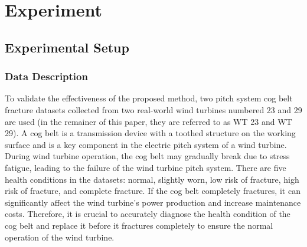 \documentclass[lettersize,journal]{IEEEtran}
\begin{document}
\section{Experiment}
\subsection{Experimental Setup}
\subsubsection{Data Description}
\label{secdatadesc}
To validate the effectiveness of the proposed method, two pitch system cog belt fracture datasets collected from two real-world wind turbines numbered 23 and 29 are used\cite{industrybigdata} (in the remainer of this paper, they are referred to as WT 23 and WT 29). A cog belt is a transmission device with a toothed structure on the working surface and is a key component in the electric pitch system of a wind turbine. During wind turbine operation, the cog belt may gradually break due to stress fatigue, leading to the failure of the wind turbine pitch system. There are five health conditions in the datasets: normal, slightly worn, low risk of fracture, high risk of fracture, and complete fracture. If the cog belt completely fractures, it can significantly affect the wind turbine's power production and increase maintenance costs. Therefore, it is crucial to accurately diagnose the health condition of the cog belt and replace it before it fractures completely to ensure the normal operation of the wind turbine. 

\end{document}

